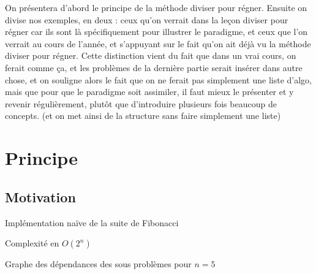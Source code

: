 
\begin{com}
	On présentera d'abord le principe de la méthode diviser pour régner. Ensuite on divise nos exemples, en deux : ceux qu'on verrait dans la leçon diviser pour régner car ils sont là spécifiquement pour illustrer le paradigme, et ceux que l'on verrait au cours de l'année, et s'appuyant sur le fait qu'on ait déjà vu la méthode diviser pour régner. Cette distinction vient du fait que dans un vrai cours, on ferait comme ça, et les problèmes de la dernière partie serait insérer dans autre chose, et on souligne alors le fait que on ne ferait pas simplement une liste d'algo, mais que pour que le paradigme soit assimiler, il faut mieux le présenter et y revenir régulièrement, plutôt que d'introduire plusieurs fois beaucoup de concepts. (et on met ainsi de la structure sans faire simplement une liste)
\end{com}

\section{Principe}

\subsection{Motivation}

\begin{algo}
	Implémentation naïve de la suite de Fibonacci\\
	\begin{algorithm}[H]
		\caption{$fibo(n)$}
			{}
			{}
	\end{algorithm}
\end{algo}

\begin{proposition}
	Complexité en $O(2^n)$
\end{proposition}

Graphe des dépendances des sous problèmes pour $n = 5$

